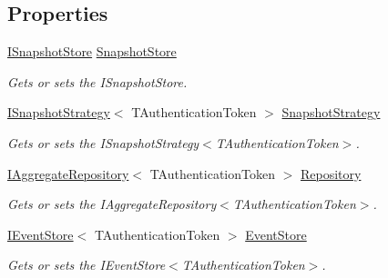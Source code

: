 \subsection*{Properties}
\begin{DoxyCompactItemize}
\item 
\hyperlink{interfaceCqrs_1_1Snapshots_1_1ISnapshotStore}{I\+Snapshot\+Store} \hyperlink{classCqrs_1_1Akka_1_1Snapshots_1_1AkkaSnapshotRepository_a83f16c1598f3df2a8889fdf5cab5dfb9_a83f16c1598f3df2a8889fdf5cab5dfb9}{Snapshot\+Store}
\begin{DoxyCompactList}\small\item\em Gets or sets the I\+Snapshot\+Store. \end{DoxyCompactList}\item 
\hyperlink{interfaceCqrs_1_1Snapshots_1_1ISnapshotStrategy}{I\+Snapshot\+Strategy}$<$ T\+Authentication\+Token $>$ \hyperlink{classCqrs_1_1Akka_1_1Snapshots_1_1AkkaSnapshotRepository_ad230c1d7f2d70973cdf116b14fcd0ab0_ad230c1d7f2d70973cdf116b14fcd0ab0}{Snapshot\+Strategy}
\begin{DoxyCompactList}\small\item\em Gets or sets the I\+Snapshot\+Strategy$<$\+T\+Authentication\+Token$>$. \end{DoxyCompactList}\item 
\hyperlink{interfaceCqrs_1_1Domain_1_1IAggregateRepository}{I\+Aggregate\+Repository}$<$ T\+Authentication\+Token $>$ \hyperlink{classCqrs_1_1Akka_1_1Snapshots_1_1AkkaSnapshotRepository_a4961f1b8481f1205c143172185bae3bb_a4961f1b8481f1205c143172185bae3bb}{Repository}
\begin{DoxyCompactList}\small\item\em Gets or sets the I\+Aggregate\+Repository$<$\+T\+Authentication\+Token$>$. \end{DoxyCompactList}\item 
\hyperlink{interfaceCqrs_1_1Events_1_1IEventStore}{I\+Event\+Store}$<$ T\+Authentication\+Token $>$ \hyperlink{classCqrs_1_1Akka_1_1Snapshots_1_1AkkaSnapshotRepository_a72905e056029898df21f5644bce4ab69_a72905e056029898df21f5644bce4ab69}{Event\+Store}
\begin{DoxyCompactList}\small\item\em Gets or sets the I\+Event\+Store$<$\+T\+Authentication\+Token$>$. \end{DoxyCompactList}\item 

\end{DoxyCompactItemize}
